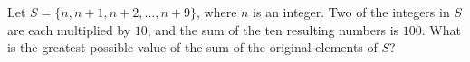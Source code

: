 Let $S=\{n,n+1,n+2,\dots,n+9\}$, where $n$ is an integer. Two of the integers in $S$ are each multiplied by $10$, and the sum of the ten resulting numbers is $100$. What is the greatest possible value of the sum of the original elements of $S$?
